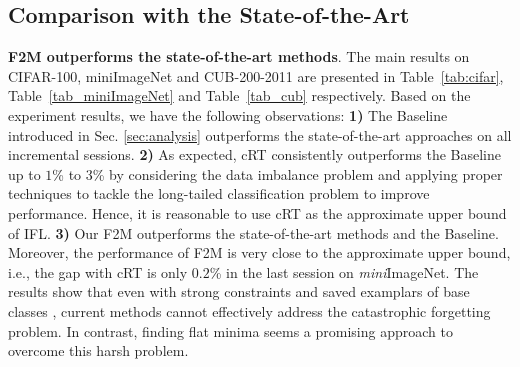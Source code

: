 \documentclass{article}
\begin{document}
\subsection{Comparison with the State-of-the-Art}
\textbf{F2M outperforms the state-of-the-art methods}. The main results on CIFAR-100, miniImageNet and CUB-200-2011 are presented in Table~\ref{tab:cifar}, Table~\ref{tab_miniImageNet} and Table~\ref{tab_cub} respectively. Based on the experiment results, we have the following observations: \textbf{1)} The Baseline introduced in Sec. \ref{sec:analysis} outperforms the state-of-the-art approaches on all incremental sessions. \textbf{2)} As expected, cRT consistently outperforms the Baseline up to $1$\% to $3$\% by considering the data imbalance problem and applying proper techniques to tackle the long-tailed classification problem to improve performance. Hence, it is reasonable to use cRT as the approximate upper bound of IFL. \textbf{3)} Our F2M outperforms the state-of-the-art methods and the Baseline. Moreover, the performance of F2M is very close to the approximate upper bound, i.e., the gap with cRT is only $0.2$\% in the last session on \emph{mini}ImageNet.
The results show that even with strong constraints  \cite{NCM,icarl,FSLL} and saved examplars of base classes \cite{NCM,icarl,IDLVQC}, current methods cannot effectively address the catastrophic forgetting problem. In contrast, finding flat minima seems a promising approach to overcome this harsh problem.
\end{document}
